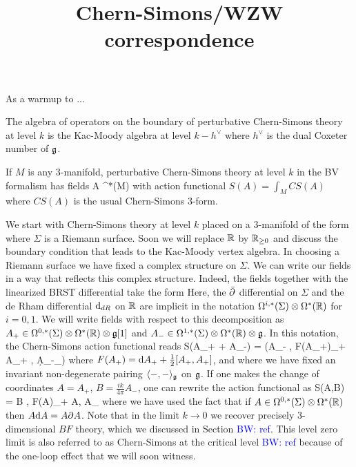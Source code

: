 \documentclass[10pt]{amsart}
\title{Chern-Simons/WZW correspondence}
\def\brian{\textcolor{blue}{BW: }\textcolor{blue}}
\begin{document}
\maketitle

As a warmup to ...

\begin{prop}
The algebra of operators on the boundary of perturbative Chern-Simons theory at level $k$ is the Kac-Moody algebra at level $k - h^\vee$ where $h^\vee$ is the dual Coxeter number of $\mathfrak g$.
\end{prop}

If $M$ is any $3$-manifold, perturbative Chern-Simons theory at level $k$ in the BV formalism has fields
\ben
A \in \Omega^*(M) \tensor \fg [1]
\een
with action functional $S(A) = \int_M CS(A)$ where $CS(A)$ is the usual Chern-Simons $3$-form. 

We start with Chern-Simons theory at level $k$ placed on a $3$-manifold of the form
\ben
\Sigma \times \RR
\een
where $\Sigma$ is a Riemann surface. 
Soon we will replace $\mathbb R$ by $\mathbb R_{\geq 0}$ and discuss the boundary condition that leads to the Kac-Moody vertex algebra.
In choosing a Riemann surface we have fixed a complex structure on $\Sigma$. 
We can write our fields in a way that reflects this complex structure. 
Indeed, the fields together with the linearized BRST differential take the form
\ben
{}
\een
Here, the $\Bar{\partial}$ differential on $\Sigma$ and the de Rham differential ${\rm d}_{dR}$ on $\mathbb R$ are implicit in the notation $\Omega^{i,*}(\Sigma) \otimes \Omega^*(\mathbb R)$ for $i=0,1$. 
We will write fields with respect to this decomposition as $A_+ \in \Omega^{0,*}(\Sigma) \otimes \Omega^*(\mathbb R) \otimes \mathfrak g[1]$ and $A_- \in \Omega^{1,*}(\Sigma) \otimes \Omega^*(\mathbb R) \otimes \mathfrak g$. 
In this notation, the Chern-Simons action functional reads
\ben
S(A_+ + A_-) =  \int \left(\<A_- , F(A_+)\>_\fg +  \<A_+ , \d A_-\>_\fg \right)
\een
where $F(A_+) = {\rm d} A_+ + \frac{1}{2} [A_+, A_+]$, and where we have fixed an invariant non-degenerate pairing $\langle-,-\rangle_\mathfrak g$ on $\mathfrak g$. 
If one makes the change of coordinates $A = A_+$, $B = \frac{ik}{4\pi} A_-$, one can rewrite the action functional as
\ben
S(A,B) = \int \<B , F(A)\>_\fg +  \int \<A, \partial A\>_\fg
\een
where we have used the fact that if $A \in \Omega^{0,*}(\Sigma) \otimes \Omega^*(\mathbb R)$ then $A {\rm d} A = A \partial A$. 
Note that in the limit $k \to 0$ we recover precisely $3$-dimensional $BF$ theory, which we discussed in Section \brian{ref}. 
This level zero limit is also referred to as Chern-Simons at the critical level \brian{ref} because of the one-loop effect that we will soon witness. 
\end{document}
